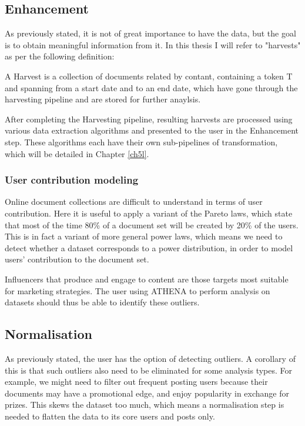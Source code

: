 \subsection{Enhancement}
As previously stated, it is not of great importance to have the data, but the goal is to obtain meaningful information from it. In this thesis I will refer to "harvests" as per the following definition:

\begin{definition}{}
A Harvest is a collection of documents related by contant, containing a token T and spanning from a start date and to an end date, which have gone through the harvesting pipeline and are stored for further anaylsis.
\end{definition}

After completing the Harvesting pipeline, resulting harvests are processed using various data extraction algorithms and presented to the user in the Enhancement step. These algorithms each have their own sub-pipelines of transformation, which will be detailed in Chapter \ref{ch5l}.

\subsubsection{User contribution modeling}
Online document collections are difficult to understand in terms of user contribution. Here it is useful to apply a variant of the Pareto laws, which state that most of the time 80\% of a document set will be created by 20\% of the users. This is in fact a variant of more general power laws, which means we need to detect whether a dataset corresponds to a power distribution, in order to model users' contribution to the document set.

Influencers that produce and engage to content are those targets most suitable for marketing strategies. The user using ATHENA to perform analysis on datasets should thus be able to identify these outliers.

\subsection{Normalisation}
As previously stated, the user has the option of detecting outliers. A corollary of this is that such outliers also need to be eliminated for some analysis types. For example, we might need to filter out frequent posting users because their documents may have a promotional edge, and enjoy popularity in exchange for prizes. This skews the dataset too much, which means a normalisation step is needed to flatten the data to its core users and posts only.

